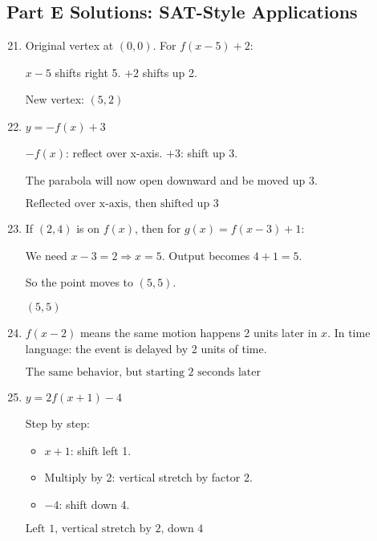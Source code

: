 \documentclass[12pt]{article}
\begin{document}
\subsection*{Part E Solutions: SAT-Style Applications}
\begin{enumerate}
  \setcounter{enumi}{20}
  \item Original vertex at \((0,0)\). For \(f(x - 5) + 2\):

  \(x - 5\) shifts right 5. \(+2\) shifts up 2.

  New vertex: \(\boxed{(5, 2)}\)

  \item \(y = -f(x) + 3\)

  \(-f(x)\): reflect over x-axis.  
  \(+3\): shift up 3.

  The parabola will now open downward and be moved up 3.

  \(\boxed{\text{Reflected over x-axis, then shifted up 3}}\)

  \item If \((2,4)\) is on \(f(x)\), then for \(g(x) = f(x - 3) + 1\):

  We need \(x - 3 = 2 \Rightarrow x = 5.\)  
  Output becomes \(4 + 1 = 5.\)

  So the point moves to \((5,5)\).

  \(\boxed{(5, 5)}\)

  \item \(f(x - 2)\) means the same motion happens 2 units later in \(x\).  
  In time language: the event is delayed by 2 units of time.

  \(\boxed{\text{The same behavior, but starting 2 seconds later}}\)

  \item \(y = 2f(x + 1) - 4\)

  Step by step:
  \begin{itemize}
    \item \(x + 1\): shift left 1.
    \item Multiply by 2: vertical stretch by factor 2.
    \item \(-4\): shift down 4.
  \end{itemize}

  \(\boxed{\text{Left 1, vertical stretch by 2, down 4}}\)
\end{enumerate}
\end{document}
